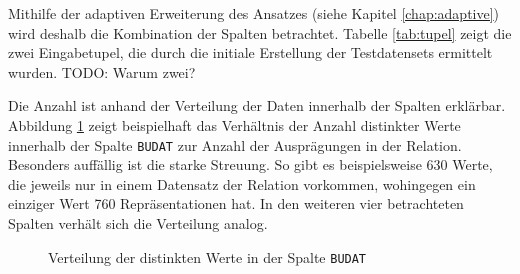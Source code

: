 Mithilfe der adaptiven Erweiterung des Ansatzes (siehe Kapitel \ref{chap:adaptive}) wird deshalb die Kombination der Spalten betrachtet.
Tabelle \ref{tab:tupel} zeigt die zwei Eingabetupel, die durch die initiale Erstellung der Testdatensets ermittelt wurden.
TODO: Warum zwei?
\begin{table}[ht]
	\centering
	\caption{Gefundene Tupel für Testdatensets inklusive Ausführungszeiten}
	\label{tab:tupel}
\end{table}

Die Anzahl ist anhand der Verteilung der Daten innerhalb der Spalten erklärbar.
Abbildung \ref{fig:budatverteilung} zeigt beispielhaft das Verhältnis der Anzahl distinkter Werte innerhalb der Spalte \texttt{BUDAT} zur Anzahl der Ausprägungen in der Relation.
Besonders auffällig ist die starke Streuung.
So gibt es beispielsweise 630 Werte, die jeweils nur in einem Datensatz der Relation vorkommen, wohingegen ein einziger Wert 760 Repräsentationen hat.
In den weiteren vier betrachteten Spalten verhält sich die Verteilung analog.

\begin{figure}[h!]
\centering
	\caption{Verteilung der distinkten Werte in der Spalte \texttt{BUDAT}}
	\label{fig:budatverteilung}
\end{figure}

